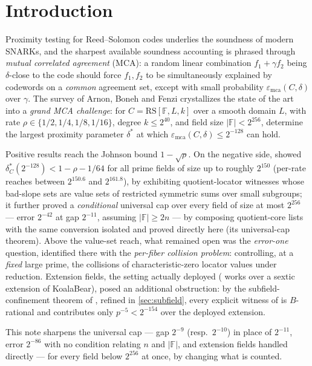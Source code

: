 \documentclass[11pt]{article}
\theoremstyle{definition}
\theoremstyle{remark}
\newcommand{\F}{\mathbb{F}}
\newcommand{\B}{B}
\newcommand{\RS}{\mathrm{RS}}
\newcommand{\emca}{\varepsilon_{\mathrm{mca}}}
\begin{document}
\section{Introduction}\label{sec:intro}

Proximity testing for Reed--Solomon codes underlies the soundness of modern SNARKs, and the sharpest available soundness accounting is phrased through \emph{mutual correlated agreement} (MCA): a random linear combination $f_1+\gamma f_2$ being $\delta$-close to the code should force $f_1,f_2$ to be simultaneously explained by codewords on a \emph{common} agreement set, except with small probability $\emca(C,\delta)$ over $\gamma$. The survey of Arnon, Boneh and Fenzi \cite{ABF26} crystallizes the state of the art into a \emph{grand MCA challenge}: for $C=\RS[\F,L,k]$ over a smooth domain $L$, with rate $\rho\in\{1/2,1/4,1/8,1/16\}$, degree $k\le2^{40}$, and field size $|\F|<2^{256}$, determine the largest proximity parameter $\delta^*$ at which $\emca(C,\delta)\le2^{-128}$ can hold.

Positive results reach the Johnson bound $1-\sqrt\rho$. On the negative side, \cite{Cho26b} showed $\delta^*_C(2^{-128})<1-\rho-1/64$ for all prime fields of size up to roughly $2^{150}$ (per-rate reaches between $2^{150.6}$ and $2^{161.8}$), by exhibiting quotient-locator witnesses whose bad-slope sets are value sets of restricted symmetric sums over small subgroups; it further proved a \emph{conditional} universal cap over every field of size at most $2^{256}$ --- error $2^{-42}$ at gap $2^{-11}$, assuming $|\F|\ge2n$ --- by composing quotient-core lists with the same conversion isolated and proved directly here (its universal-cap theorem). Above the value-set reach, what remained open was the \emph{error-one} question, identified there with the \emph{per-fiber collision problem}: controlling, at a \emph{fixed} large prime, the collisions of characteristic-zero locator values under reduction. Extension fields, the setting actually deployed (\cite[\S6.3]{ABF26} works over a sextic extension of KoalaBear), posed an additional obstruction: by the subfield-confinement theorem of \cite{Cho26b}, refined in \cref{sec:subfield}, every explicit witness of \cite{Cho26a,Cho26b} is $\B$-rational and contributes only $p^{-5}<2^{-154}$ over the deployed extension.

This note sharpens the universal cap --- gap $2^{-9}$ (resp.\ $2^{-10}$) in place of $2^{-11}$, error $2^{-86}$ with no condition relating $n$ and $|\F|$, and extension fields handled directly --- for every field below $2^{256}$ at once, by changing what is counted.
\end{document}
